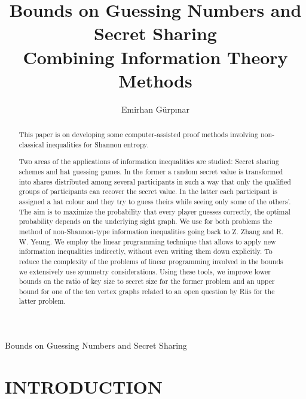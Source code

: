 \documentclass[11pt, a4paper]{kybernetika}
\begin{document}
	\pagestyle{myheadings}
	\title{Bounds on Guessing Numbers and Secret Sharing \\ Combining Information Theory Methods}
	\author{Emirhan G\"urpınar}
	 {Bounds on Guessing Numbers and Secret Sharing}
	\maketitle
	\begin{abstract}
		This paper is on developing some computer-assisted proof methods involving non-classical inequalities for Shannon entropy.
		
		Two areas of the applications of information inequalities are studied: Secret sharing schemes and hat guessing games. In the former a random secret value is transformed into shares distributed among several participants in such a way that only the qualified groups of participants can recover the secret value. In the latter each participant is assigned a hat colour and they try to guess theirs while seeing only some of the others'. The aim is to maximize the probability that every player guesses correctly, the optimal probability depends on the underlying sight graph. We use for both problems the method of non-Shannon-type information inequalities going back to Z. Zhang and R. W. Yeung. We employ the linear programming technique that allows to apply new information inequalities indirectly, without even writing them down explicitly. To reduce the complexity of the problems of linear programming involved in the bounds we extensively use symmetry considerations. Using these tools, we improve lower bounds on the ratio of key size to secret size for the former problem and an upper bound for one of the ten vertex graphs related to an open question by Riis for the latter problem.
	\end{abstract}	
	
	
	
	\section{INTRODUCTION}
	
\end{document}
